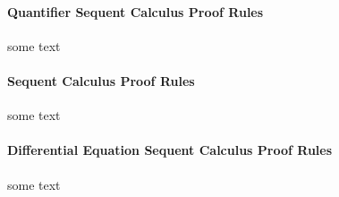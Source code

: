     \paragraph{Quantifier Sequent Calculus Proof Rules}
        \label{sec:quantifier-rules}

        some text

        \begin{calculus}
        \end{calculus}

    \paragraph{\dL Sequent Calculus Proof Rules}
        \label{sec:dL-rules}

        some text

        \begin{calculus}
        \end{calculus}

    \paragraph{Differential Equation Sequent Calculus Proof Rules}
        \label{sec:ode-rules}

        some text

